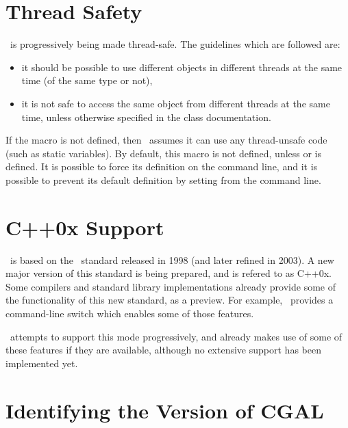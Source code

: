 \section{Thread Safety}

\cgal\ is progressively being made thread-safe.  The guidelines which are followed
are:
\begin{itemize}
\item it should be possible to use different objects in different threads at
the same time (of the same type or not),
\item it is not safe to access the same object from different threads
at the same time, unless otherwise specified in the class documentation.
\end{itemize}

If the macro  is not defined, then \cgal\ assumes it can use
any thread-unsafe code (such as static variables).  By default, this macro is not
defined, unless  or  is defined.  It is possible
to force its definition on the command line, and it is possible to prevent its default
definition by setting  from the command line.


\section{C++0x Support}

\cgal\ is based on the \CC\ standard released in 1998 (and later refined in 2003).
A new major version of this standard is being prepared, and is refered to as C++0x.
Some compilers and standard library implementations already provide some of the
functionality of this new standard, as a preview.  For example, \gcc\ provides
a command-line switch  which enables some of those features.

\cgal\ attempts to support this mode progressively, and already makes use of
some of these features if they are available, although no extensive support has
been implemented yet.




\section{Identifying the Version of CGAL\label{sec:cgal_version}}


